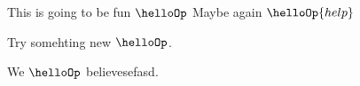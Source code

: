 \begin{module}[id=foo]
   This is going to be fun $ \helloOp $
   Maybe again $ \helloOp{help} $
\end{module}

\begin{module}[id=newMod]
 Try somehting new $ \helloOp$.
\end{module}

\begin{omtext}
   We $ \helloOp $ believesefasd.
\end{omtext}